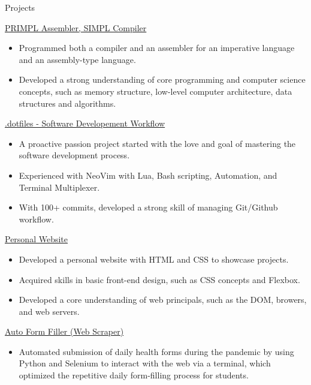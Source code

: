 \documentclass{article}
\newlength{\tabin}
\newlength{\secsep}
\newcommand{\lineunder}{\vspace*{-8pt} \\ \hspace*{-6pt} \hrulefill \\ \vspace*{-15pt}}
\newenvironment{tabbedsection}[1]{
  \begin{list}{}{
      \setlength{\itemsep}{0pt}
      \setlength{\labelsep}{0pt}
      \setlength{\labelwidth}{0pt}
      \setlength{\leftmargin}{\tabin}
      \setlength{\rightmargin}{\tabin}
      \setlength{\listparindent}{0pt}
      \setlength{\parsep}{0pt}
      \setlength{\parskip}{0pt}
      \setlength{\partopsep}{0pt}
      \setlength{\topsep}{#1}
    }
  \item[]
}{\end{list}}
\newenvironment{resume_section}[1]{
  \filbreak
  \vspace{2\secsep}
  \textsc{\large#1}
  \lineunder
  \begin{tabbedsection}{\secsep}
}{\end{tabbedsection}}
\newenvironment{resume_subsection}[2][]{
  \textbf{#2} \hfill {\footnotesize #1} \hspace{-5.1em}
  \begin{tabbedsection}{0.5\secsep}
}{\end{tabbedsection}}
\newenvironment{subitems}{
  \renewcommand{\labelitemi}{-}
  \begin{itemize}
      \setlength{\labelsep}{1em}
}{\end{itemize}}
\begin{document}
\begin{resume_section}{Projects}
  \begin{resume_subsection}[]{\href{}{PRIMPL Assembler, SIMPL Compiler}}
   \begin{subitems}
     \item Programmed both a compiler and an assembler for an imperative language and an assembly-type language.
     \item Developed a strong understanding of core programming and computer science concepts, such as memory structure, low-level computer architecture, data structures and algorithms.
    
    \end{subitems}
  \end{resume_subsection}

  \begin{resume_subsection}[]{\href{https://github.com/TwinkletoesZen/.dotfiles}{.dotfiles - Software Developement Workflow \faGithub}}
    \begin{subitems}
      \item A proactive passion project started with the love and goal of mastering the software development process.
      \item Experienced with NeoVim with Lua, Bash scripting, Automation, and Terminal Multiplexer.
      \item With 100+ commits, developed a strong skill of managing Git/Github workflow.

    \end{subitems}
  \end{resume_subsection}

  \begin{resume_subsection}[]{\href{https://github.com/TwinkletoesZen/Personal-Website}{Personal Website \faGithub}}
    \begin{subitems}
      \item Developed a personal website with HTML and CSS to showcase projects.
      \item Acquired skills in basic front-end design, such as CSS concepts and Flexbox.
      \item Developed a core understanding of web principals, such as the DOM, browers, and web servers.
    \end{subitems}
  \end{resume_subsection}

  \begin{resume_subsection}[]{\href{https://github.com/TwinkletoesZen/Auto-HealthCheck-Completer}{Auto Form Filler (Web Scraper) \faGithub}}
    \begin{subitems}
      \item Automated submission of daily health forms during the pandemic by using Python and Selenium to interact with the web via a terminal, which optimized the repetitive daily form-filling process for students.
    \end{subitems}
  \end{resume_subsection}



\end{resume_section}
\end{document}
